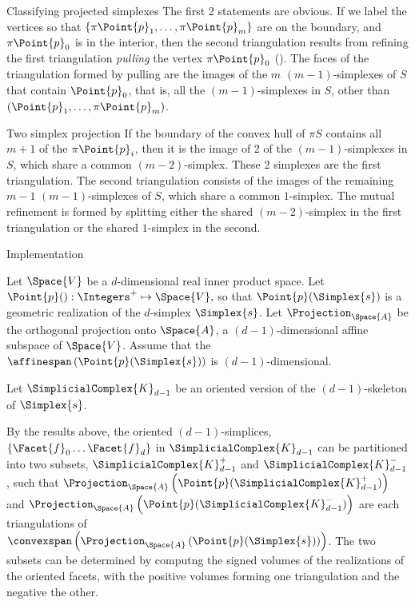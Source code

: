 \begin{plSection}{Classifying projected simplexes}
The first 2 statements are obvious.
If we label the vertices so that $\{\pi \Point{p}_1, \ldots , \pi \Point{p}_m\}$
are on the boundary, and $\pi \Point{p}_0$ is in the interior,
then the second triangulation results from refining the first
triangulation {\it pulling} the vertex $\pi \Point{p}_0$
().
The faces of the triangulation formed by pulling
are the images of the $m$ $(m-1)$-simplexes
of $S$ that contain $\Point{p}_0$, that is, all the $(m-1)$-simplexes in $S$,
other than $(\Point{p}_1, \ldots , \pi \Point{p}_m)$.

\begin{plTheorem}{Two simplex projection}{}
\label{two-simplex-case}
If the boundary of the convex hull of $\pi S$
contains all $m+1$ of the $\pi \Point{p}_i$,
then it is the image of 2 of the $(m-1)$-simplexes in $S$,
which share a common $(m-2)$-simplex.
These 2 simplexes are the first triangulation.
The second triangulation consists of the images
of the remaining $m-1$ $(m-1)$-simplexes of $S$,
which share a common $1$-simplex.
The mutual refinement is formed by splitting either
the shared $(m-2)$-simplex in the first triangulation
or the shared $1$-simplex in the second.
\end{plTheorem}

\begin{plSection}{Implementation}

Let $\Space{V}$ be a $d$-dimensional real inner product space.
Let $\Point{p}() : \Integers^{+} \mapsto \Space{V},$
so that $\Point{p}(\Simplex{s})$ is a geometric realization 
of the $d$-simplex $\Simplex{s}$.
Let $\Projection_{\Space{A}}$ be the orthogonal projection onto
$\Space{A}$, a $(d-1)$-dimensional affine subspace of $\Space{V}$.
Assume that the $\affinespan \left( \Point{p}(\Simplex{s}) \right)$
is $(d-1)$-dimensional.

Let $\SimplicialComplex{K}_{d-1}$ be an oriented version of the $(d-1)$-skeleton of $\Simplex{s}$.

By the results above, the oriented $(d-1)$-simplices,
$\{ \Facet{f}_0 \ldots \Facet{f}_d \}$ in $\SimplicialComplex{K}_{d-1}$
can be partitioned into two subsets, $\SimplicialComplex{K}_{d-1}^{+}$
and $\SimplicialComplex{K}_{d-1}^{-}$, such that
$\Projection_{\Space{A}} \left( \Point{p} ( \SimplicialComplex{K}_{d-1}^{+} ) \right)$
and
$\Projection_{\Space{A}} \left( \Point{p} ( \SimplicialComplex{K}_{d-1}^{-} ) \right)$
are each triangulations of
$\convexspan \left( \Projection_{\Space{A}} \left( \Point{p} ( \Simplex{s} ) \right) \right)$.
The two subsets can be determined by computng the signed
volumes of the realizations of the oriented facets,
with the positive volumes forming one triangulation and the negative the other.


\end{plSection}
\end{plSection}
